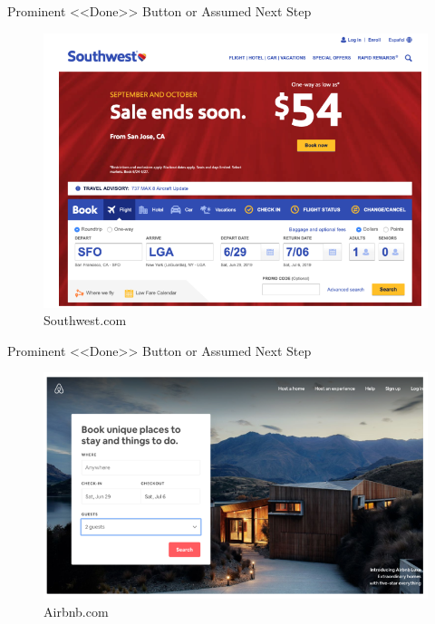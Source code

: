 \documentclass{beamer}
\begin{document}
\begin{frame}[t]{Prominent <<Done>> Button or Assumed Next Step}
	\begin{figure}[h]
		\centering
		\includegraphics[scale=0.6]{images/lec08-pic12.png}
		\caption{Southwest.com}
	\end{figure}
\end{frame}

\begin{frame}[t]{Prominent <<Done>> Button or Assumed Next Step}
	\begin{figure}[h]
		\centering
		\includegraphics[scale=0.6]{images/lec08-pic13.png}
		\caption{Airbnb.com}
	\end{figure}
\end{frame}
\end{document}
